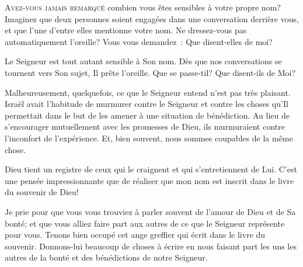


\lettrine{A}{vez-vous jamais remarqué} combien vous êtes sensibles
 à votre propre nom? Imaginez que deux personnes soient engagées
 dans une conversation derrière vous, et que l'une d'entre elles
 mentionne votre nom. Ne dressez-vous pas automatiquement l'oreille?
 Vous vous demandez~:  \og Que disent-elles de moi? \fg{}

Le Seigneur est tout autant sensible à Son nom. Dès que nos conversations
 se tournent vers Son sujet, Il prête l'oreille.
 \og Que se passe-til? Que disent-ils de Moi? \fg{}

Malheureusement, quelquefois, ce que le Seigneur entend n'est pas très
 plaisant. Israël avait l'habitude de murmurer contre le Seigneur
 et contre les choses qu'Il permettait dans le but de les amener
 à une situation de bénédiction. Au lieu de s'encourager mutuellement
 avec les promesses de Dieu, ils murmuraient contre l'inconfort
 de l'expérience. Et, bien souvent, nous sommes coupables de la même chose. 


Dieu tient un registre de ceux qui le craignent et qui s'entretiennent de Lui.
 C'est une pensée impressionnante que de réaliser que mon nom est inscrit
 dans le livre du souvenir de Dieu! 

Je prie pour que vous vous trouviez à parler souvent de l'amour de Dieu
 et de Sa bonté; et que vous alliez faire part aux autres de ce que
 le Seigneur représente pour vous. Tenons bien occupé cet
 \og ange greffier \fg{} qui écrit dans le livre du souvenir.
 Donnons-lui beaucoup de choses à écrire en nous faisant part les uns
 les autres de la bonté et des bénédictions de notre Seigneur. 


\dvrule




